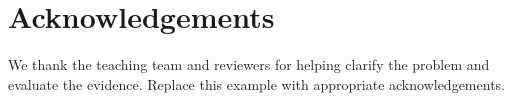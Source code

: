 \chapter*{Acknowledgements}
We thank the teaching team and reviewers for helping clarify the problem and evaluate the evidence. Replace this example with appropriate acknowledgements.

